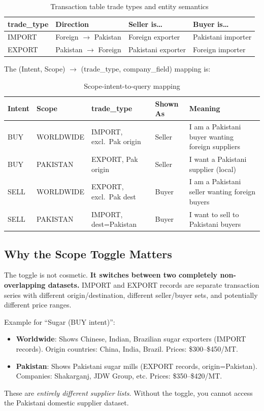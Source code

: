 \documentclass[12pt,a4paper]{article}
\begin{document}
\begin{table}[H]
\centering
\renewcommand{\arraystretch}{1.4}
\begin{tabularx}{\textwidth}{lXXl}
\toprule
\textbf{trade\_type} & \textbf{Direction} & \textbf{Seller is\ldots} & \textbf{Buyer is\ldots} \\
\midrule
IMPORT & Foreign $\to$ Pakistan & Foreign exporter & Pakistani importer \\
EXPORT & Pakistan $\to$ Foreign & Pakistani exporter & Foreign importer \\
\bottomrule
\end{tabularx}
\caption{Transaction table trade types and entity semantics}
\end{table}

The (Intent, Scope) $\to$ (trade\_type, company\_field) mapping is:

\begin{table}[H]
\centering
\renewcommand{\arraystretch}{1.4}
\begin{tabularx}{\textwidth}{llllX}
\toprule
\textbf{Intent} & \textbf{Scope} & \textbf{trade\_type} & \textbf{Shown As} & \textbf{Meaning} \\
\midrule
BUY & WORLDWIDE & IMPORT, excl.\ Pak origin & Seller & I am a Pakistani buyer wanting foreign suppliers \\
BUY & PAKISTAN & EXPORT, Pak origin & Seller & I want a Pakistani supplier (local) \\
SELL & WORLDWIDE & EXPORT, excl.\ Pak dest & Buyer & I am a Pakistani seller wanting foreign buyers \\
SELL & PAKISTAN & IMPORT, dest=Pakistan & Buyer & I want to sell to Pakistani buyers \\
\bottomrule
\end{tabularx}
\caption{Scope-intent-to-query mapping}
\end{table}

\subsection{Why the Scope Toggle Matters}

The toggle is not cosmetic. \textbf{It switches between two completely non-overlapping
datasets.} IMPORT and EXPORT records are separate transaction series with different
origin/destination, different seller/buyer sets, and potentially different price ranges.

Example for ``Sugar (BUY intent)'':
\begin{itemize}
  \item \textbf{Worldwide}: Shows Chinese, Indian, Brazilian sugar exporters (IMPORT records).
        Origin countries: China, India, Brazil. Prices: \$300--\$450/MT.
  \item \textbf{Pakistan}: Shows Pakistani sugar mills (EXPORT records, origin=Pakistan).
        Companies: Shakarganj, JDW Group, etc. Prices: \$350--\$420/MT.
\end{itemize}
These are \textit{entirely different supplier lists}. Without the toggle, you cannot access
the Pakistani domestic supplier dataset.
\end{document}
